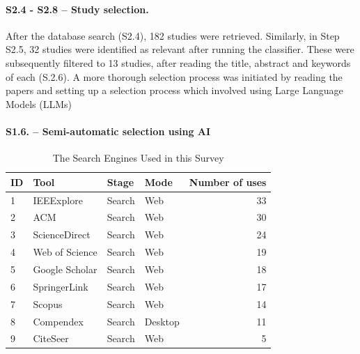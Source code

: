 \paragraph{S2.4 - S2.8 -- Study selection.}
After the database search (S2.4), 182 studies were retrieved. Similarly, in Step S2.5, 32 studies
were identified as relevant after running the classifier. These were subsequently filtered to 13
studies, after reading the title, abstract and keywords of each (S.2.6). A more thorough selection 
process was initiated by reading the papers and setting up a selection process which involved using
Large Language Models (LLMs)

\paragraph{S1.6. -- Semi-automatic selection using AI}
\label{sec:ai-screening}

\begin{table}[htbp]
	\centering
	\caption{The Search Engines Used in this Survey}
	\label{tab:databases}
	\begin{tabular}{llllr}
		\hline
		ID & Tool           & Stage  & Mode    & Number of uses \\
		\hline
		1  & IEEExplore     & Search & Web     & 33             \\
		2  & ACM            & Search & Web     & 30             \\
		3  & ScienceDirect  & Search & Web     & 24             \\
		4  & Web of Science & Search & Web     & 19             \\
		5  & Google Scholar & Search & Web     & 18             \\
		6  & SpringerLink   & Search & Web     & 17             \\
		7  & Scopus         & Search & Web     & 14             \\
		8  & Compendex      & Search & Desktop & 11             \\
		9  & CiteSeer       & Search & Web     & 5              \\
		\hline
	\end{tabular}
\end{table}

